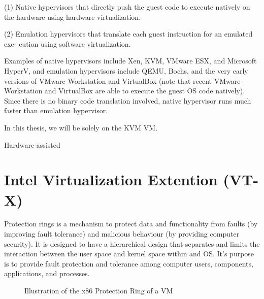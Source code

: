 \documentclass{report}
\begin{document}
\begin{spacing}{1.5}
{\large
(1) Native hypervisors that directly push the guest code to execute natively on the
hardware using hardware virtualization.
\newline
}


{\large
(2) Emulation hypervisors that translate each guest instruction for an emulated exe-
cution using software virtualization.
\newline
}

{\large
Examples of native hypervisors include Xen, KVM, VMware ESX, and Microsoft HyperV, and emulation hypervisors include QEMU, Bochs, and the very early versions of
VMware-Workstation and VirtualBox (note that recent VMware-Workstation and VirtualBox are able to execute the guest OS code natively). Since there is no binary code
translation involved, native hypervisor runs much faster than emulation hypervisor.

In this thesis, we will be solely on the KVM VM.








Hardware-assisted




}













\section{Intel Virtualization Extention (VT-X)}

{\large
Protection rings is a mechanism to protect data and functionality from faults (by improving fault tolerance) and malicious behaviour (by providing computer security). It is designed to have a hierarchical design that separates and limits the interaction between the user space and kernel space within and OS. It's purpose is to provide fault protection and tolerance among computer users, components, applications, and processes.
\newline
}

{\large
{}
\begin{figure}[!h]
\caption{Illustration of the x86 Protection Ring of a VM}
\begin{center}
\begin{tikzpicture}


\end{tikzpicture}
\end{center}
\end{figure}}
\end{spacing}
\end{document}
